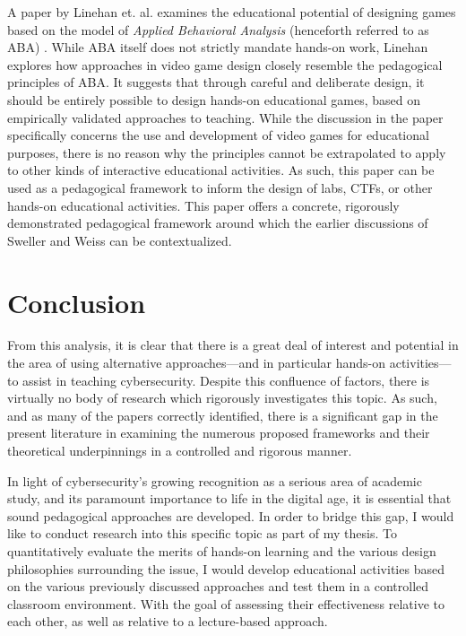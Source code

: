 \documentclass{article}
\begin{document}
    A paper by Linehan et. al. examines the educational potential of designing games based on the model of \emph{Applied Behavioral Analysis} (henceforth referred to as ABA) \cite{C-Linehan}. 
    While ABA itself does not strictly mandate hands-on work, Linehan explores how approaches in video game design closely resemble the pedagogical principles of ABA. 
    It suggests that through careful and deliberate design, it should be entirely possible to design hands-on educational games, based on empirically validated approaches to teaching. 
    While the discussion in the paper specifically concerns the use and development of video games for educational purposes, there is no reason why the principles cannot be extrapolated to apply to other kinds of interactive educational activities. 
    As such, this paper can be used as a pedagogical framework to inform the design of labs, CTFs, or other hands-on educational activities. 
    This paper offers a concrete, rigorously demonstrated pedagogical framework around which the earlier discussions of Sweller and Weiss can be contextualized. 

\section{Conclusion}

    From this analysis, it is clear that there is a great deal of interest and potential in the area of using alternative approaches---and in particular hands-on activities---to assist in teaching cybersecurity. 
    Despite this confluence of factors, there is virtually no body of research which rigorously investigates this topic. 
    As such, and as many of the papers correctly identified, there is a significant gap in the present literature in examining the numerous proposed frameworks and their theoretical underpinnings in a controlled and rigorous manner. 

    In light of cybersecurity’s growing recognition as a serious area of academic study, and its paramount importance to life in the digital age, it is essential that sound pedagogical approaches are developed. 
    In order to bridge this gap, I would like to conduct research into this specific topic as part of my thesis. 
    To quantitatively evaluate the merits of hands-on learning and the various design philosophies surrounding the issue, I would develop educational activities based on the various previously discussed approaches and test them in a controlled classroom environment. 
    With the goal of assessing their effectiveness relative to each other, as well as relative to a lecture-based approach. 


\printbibliography
\end{document}
